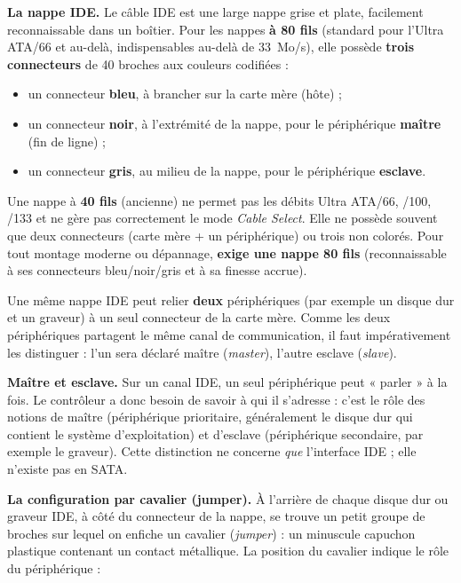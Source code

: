 \documentclass[11pt]{article}
\newcommand{\cle}[1]{{\popxbold\color{popdark}#1}}
\begin{document}
\textbf{La nappe IDE.} Le câble IDE est une large \cle{nappe} grise et plate, facilement reconnaissable dans un boîtier. Pour les nappes \textbf{à 80 fils} (standard pour l'Ultra ATA/66 et au-delà, indispensables au-delà de \SI{33}{Mo/s}), elle possède \textbf{trois connecteurs} de 40 broches aux couleurs codifiées :

\begin{itemize}
\item un connecteur \textbf{bleu}, à brancher sur la carte mère (hôte) ;
\item un connecteur \textbf{noir}, à l'extrémité de la nappe, pour le périphérique \textbf{maître} (fin de ligne) ;
\item un connecteur \textbf{gris}, au milieu de la nappe, pour le périphérique \textbf{esclave}.
\end{itemize}

\begin{attention}
Une nappe à \textbf{40 fils} (ancienne) ne permet pas les débits Ultra ATA/66, /100, /133 et ne gère pas correctement le mode \emph{Cable Select}. Elle ne possède souvent que deux connecteurs (carte mère + un périphérique) ou trois non colorés. Pour tout montage moderne ou dépannage, \textbf{exige une nappe 80 fils} (reconnaissable à ses connecteurs bleu/noir/gris et à sa finesse accrue).
\end{attention}

\begin{propriete}
Une même nappe IDE peut relier \textbf{deux} périphériques (par exemple un disque dur et un graveur) à un seul connecteur de la carte mère. Comme les deux périphériques partagent le même canal de communication, il faut impérativement les distinguer : l'un sera déclaré \cle{maître} (\emph{master}), l'autre \cle{esclave} (\emph{slave}).
\end{propriete}

\textbf{Maître et esclave.} Sur un canal IDE, un seul périphérique peut « parler » à la fois. Le contrôleur a donc besoin de savoir à qui il s'adresse : c'est le rôle des notions de \cle{maître} (périphérique prioritaire, généralement le disque dur qui contient le système d'exploitation) et d'\cle{esclave} (périphérique secondaire, par exemple le graveur). Cette distinction ne concerne \emph{que} l'interface IDE ; elle n'existe pas en SATA.

\textbf{La configuration par cavalier (jumper).} À l'arrière de chaque disque dur ou graveur IDE, à côté du connecteur de la nappe, se trouve un petit groupe de broches sur lequel on enfiche un \cle{cavalier} (\emph{jumper}) : un minuscule capuchon plastique contenant un contact métallique. La position du cavalier indique le rôle du périphérique :
\end{document}
